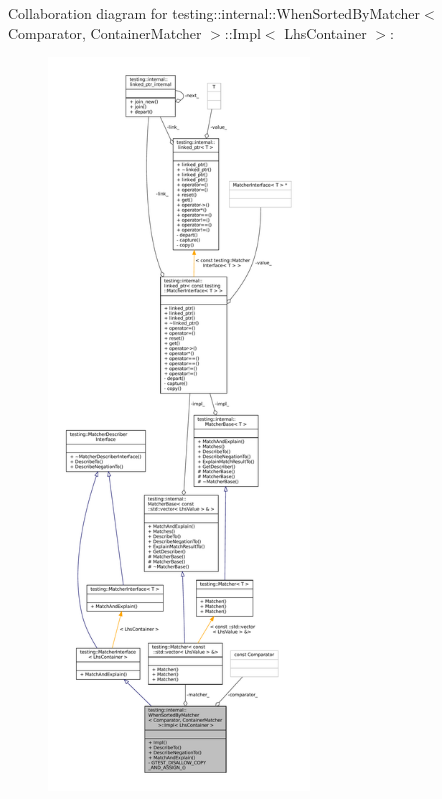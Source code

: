 Collaboration diagram for testing\+:\+:internal\+:\+:When\+Sorted\+By\+Matcher$<$ Comparator, Container\+Matcher $>$\+:\+:Impl$<$ Lhs\+Container $>$\+:
\nopagebreak
\begin{figure}[H]
\begin{center}
\leavevmode
\includegraphics[height=550pt]{classtesting_1_1internal_1_1WhenSortedByMatcher_1_1Impl__coll__graph}
\end{center}
\end{figure}
